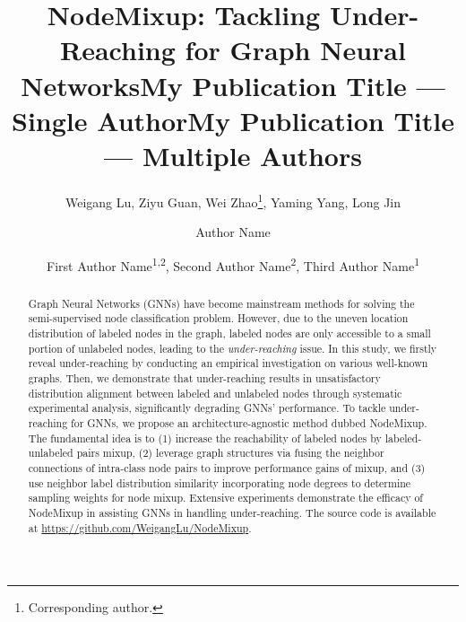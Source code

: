 \documentclass[letterpaper]{article} %
\title{NodeMixup: Tackling Under-Reaching for Graph Neural Networks}
\author{
    Weigang Lu, 
    Ziyu Guan,   
    Wei Zhao\thanks{Corresponding author.},
    Yaming Yang,
    Long Jin
}
\title{My Publication Title --- Single Author}
\author {
    Author Name
}
\title{My Publication Title --- Multiple Authors}
\author {
    First Author Name\textsuperscript{\rm 1,\rm 2},
    Second Author Name\textsuperscript{\rm 2},
    Third Author Name\textsuperscript{\rm 1}
}
\begin{document}
\maketitle

\begin{abstract}
Graph Neural Networks (GNNs) have become mainstream methods for solving the semi-supervised node classification problem. However, due to the uneven location distribution of labeled nodes in the graph, labeled nodes are only accessible to a small portion of unlabeled nodes, leading to the \emph{under-reaching} issue. In this study, we firstly reveal under-reaching by conducting an empirical investigation on various well-known graphs. Then, we demonstrate that under-reaching results in unsatisfactory distribution alignment between labeled and unlabeled nodes through systematic experimental analysis, significantly degrading GNNs' performance. To tackle under-reaching for GNNs, we propose an architecture-agnostic method dubbed NodeMixup. The fundamental idea is to (1) increase the reachability of labeled nodes by labeled-unlabeled pairs mixup, (2) leverage graph structures via fusing the neighbor connections of intra-class node pairs to improve performance gains of mixup, and (3) use neighbor label distribution similarity incorporating node degrees to determine sampling weights for node mixup. Extensive experiments demonstrate the efficacy of NodeMixup in assisting GNNs in handling under-reaching. The source code is available at \url{https://github.com/WeigangLu/NodeMixup}.

\end{abstract}
\end{document}
